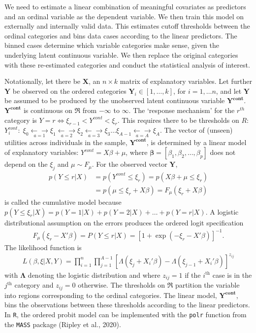 \documentclass[12pt,econ]{sources/authesis}
\begin{document}
\vspace{-0.4cm}

We need to estimate a linear combination of meaningful covariates as predictors and an ordinal variable as the dependent variable. We then train this model on externally and internally valid data. This estimates cutoff thresholds between the ordinal categories and bins data cases according to the linear predictors. The binned cases determine which variable categories make sense, given the underlying latent continuous variable. We then replace the original categories with these re-estimated categories and conduct the statistical analysis of interest.

Notationally, let there be \(\bm{X}\), an \(n \times k\) matrix of explanatory variables. Let further \(\bm{Y}\) be observed on the ordered categories \(\bm{Y}_i \in [1,\ldots,k]\), for \(i=1,\ldots n\), and let \(\bm{Y}\) be assumed to be produced by the unobserved latent continuous variable \(\bm{Y^{cont}}\). \(\bm{Y^{cont}}\) is continuous on \(\mathfrak{R}\) from \(-\infty\) to \(\infty\). The `response mechanism' for the \(r^{th}\) category is \(Y=r \Longleftrightarrow \xi_{r-1} < Y^{cont} < \xi_r\). This requires there to be thresholds on \(R\):
\(Y^{cont}_i: \; \xi_0 \underset{a=1}{\longleftarrow\!\longrightarrow} \xi_1 \underset{a=2}{\longleftarrow\!\longrightarrow} \xi_2 \underset{a=3}{\longleftarrow\!\longrightarrow} \xi_3\ldots \xi_{A-1} \underset{a=A}{\longleftarrow\!\longrightarrow} \xi_A\). The vector of (unseen) utilities across individuals in the sample, \(\bm{Y^{cont}}\), is determined by a linear model of explanatory variables: \(Y^{cont} = X \beta + \mu\), where \(\bm{\beta} =[\beta_1,\beta_2,\ldots,\beta_p]\) does not depend on the \(\xi_j\) and \(\mu \sim F_{\mu}\). For the observed vector \(\bm{Y}\),
\begin{align}
p(Y \leq r|X) &= p(Y^{cont} \leq \xi_r) = p(X \beta + \mu \leq \xi_r) \nonumber\\
&= p(\mu \leq \xi_r+ X \beta) = F_{\mu}(\xi_r + X \beta)
\end{align}
is called the cumulative model because \(p(Y \leq \xi_r|X) = p(Y=1|X) + p(Y=2|X) + \ldots + p(Y=r|X)\). A logistic distributional assumption on the errors produces the ordered logit specification
\begin{align}
F_{\mu}(\xi_r - X' \beta) = P(Y \leq r|X) = [1+\exp(-\xi_r-X' \beta)]^{-1}. 
\end{align}
The likelihood function is
\begin{align}
L(\beta, \xi|X,Y) = \prod_{i=1}^{n}\prod_{j=1}^{A-1}\left[\Lambda(\xi_j + X_i' \beta) - \Lambda(\xi_{j-1} + X_i' \beta) \right]^{z_{ij}}
\end{align}
with \(\bm{\Lambda}\) denoting the logistic distribution and where \(z_{ij}=1\) if the \(i^\text{th}\) case is in the \(j^\text{th}\) category and \(z_{ij}=0\) otherwise. The thresholds on \(\mathfrak{R}\) partition the variable into regions corresponding to the ordinal categories. The linear model, \(\bm{Y^{cont}}\), bins the observations between these thresholds according to the linear predictors. In \texttt{R}, the ordered probit model can be implemented with the \texttt{polr} function from the \texttt{MASS} package (Ripley et al., 2020).
\end{document}
